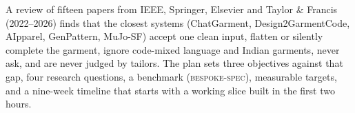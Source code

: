 \documentclass[11pt,oneside,openany]{book}
\begin{document}
A review of fifteen papers from IEEE, Springer, Elsevier and Taylor \& Francis (2022--2026) finds that the closest systems (ChatGarment, Design2GarmentCode, AIpparel, GenPattern, MuJo-SF) accept one clean input, flatten or silently complete the garment, ignore code-mixed language and Indian garments, never ask, and are never judged by tailors. The plan sets three objectives against that gap, four research questions, a benchmark (\textsc{bespoke-spec}), measurable targets, and a nine-week timeline that starts with a working slice built in the first two hours.

\cleardoublepage
\tableofcontents

\mainmatter
\pagestyle{body}






\backmatter
\renewcommand{\bibname}{References}

\end{document}
